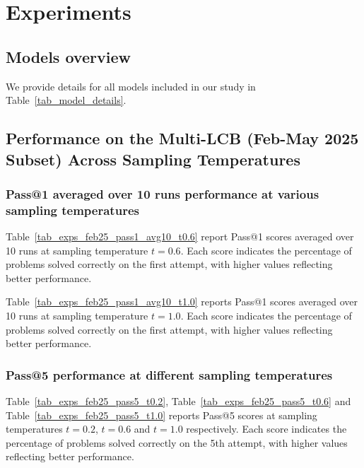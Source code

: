 \documentclass{article} %
\begin{document}
\section{Experiments}
\label{app_exp_results}

\subsection{Models overview}
\label{app_subsec_models}

We provide details for all models included in our study in Table~\ref{tab_model_details}.



\subsection{Performance on the Multi-LCB (Feb-May 2025 Subset) Across Sampling Temperatures}


\subsubsection{Pass@1 averaged over 10 runs performance at various sampling temperatures}

Table~\ref{tab_exps_feb25_pass1_avg10_t0.6} report Pass@1 scores averaged over 10 runs at sampling temperature $t=0.6$. Each score indicates the percentage of problems solved correctly on the first attempt, with higher values reflecting better performance. 



 Table~\ref{tab_exps_feb25_pass1_avg10_t1.0} reports Pass@1 scores averaged over 10 runs at sampling temperature $t=1.0$. Each score indicates the percentage of problems solved correctly on the first attempt, with higher values reflecting better performance.

 



\subsubsection{Pass@5 performance at different sampling temperatures}

Table~\ref{tab_exps_feb25_pass5_t0.2}, Table~\ref{tab_exps_feb25_pass5_t0.6} and Table~\ref{tab_exps_feb25_pass5_t1.0} reports Pass@5 scores at sampling temperatures $t=0.2$, $t=0.6$ and $t=1.0$ respectively. Each score indicates the percentage of problems solved correctly on the 5th attempt, with higher values reflecting better performance. 
\end{document}
